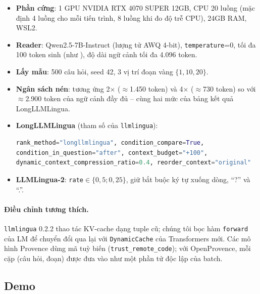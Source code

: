 \begin{itemize}
  \item \textbf{Phần cứng}: 1 GPU NVIDIA RTX 4070 SUPER 12GB, CPU 20 luồng (mặc định 4 luồng cho mỗi
  tiến trình, 8 luồng khi đo độ trễ CPU), 24GB RAM, WSL2.
  \item \textbf{Reader}: Qwen2.5-7B-Instruct (lượng tử AWQ 4-bit), \texttt{temperature}=0,
  tối đa 100 token sinh (như \citet{liu2024lost}), độ dài ngữ cảnh tối đa 4.096 token.
  \item \textbf{Lấy mẫu}: 500 câu hỏi, seed 42, 3 vị trí đoạn vàng $\{1,10,20\}$.
  \item \textbf{Ngân sách nén}: tương ứng 2$\times$ ($\approx$1.450 token) và 4$\times$ ($\approx$730 token)
  so với $\approx$2.900 token của ngữ cảnh đầy đủ -- cùng hai mức của bảng kết quả LongLLMLingua.
  \item \textbf{LongLLMLingua} (tham số của \texttt{llmlingua}):
\begin{lstlisting}[language=Python,basicstyle=\ttfamily\footnotesize,aboveskip=0.4em,belowskip=0.2em]
rank_method="longllmlingua", condition_compare=True,
condition_in_question="after", context_budget="+100",
dynamic_context_compression_ratio=0.4, reorder_context="original"
\end{lstlisting}
  \item \textbf{LLMLingua-2}: \texttt{rate}$\in\{0{,}5; 0{,}25\}$, giữ bắt buộc ký tự xuống dòng, ``?'' và ``.''.
\end{itemize}

\paragraph{Điều chỉnh tương thích.} \texttt{llmlingua} 0.2.2 thao tác KV-cache dạng tuple cũ; chúng
tôi bọc hàm \texttt{forward} của LM để chuyển đổi qua lại với \texttt{DynamicCache} của Transformers
mới. Các mô hình Provence dùng mã tuỳ biến (\texttt{trust\_remote\_code}); với OpenProvence, mỗi cặp
(câu hỏi, đoạn) được đưa vào như một phần tử độc lập của batch.

\subsection{Demo}
\label{sec:demo}


